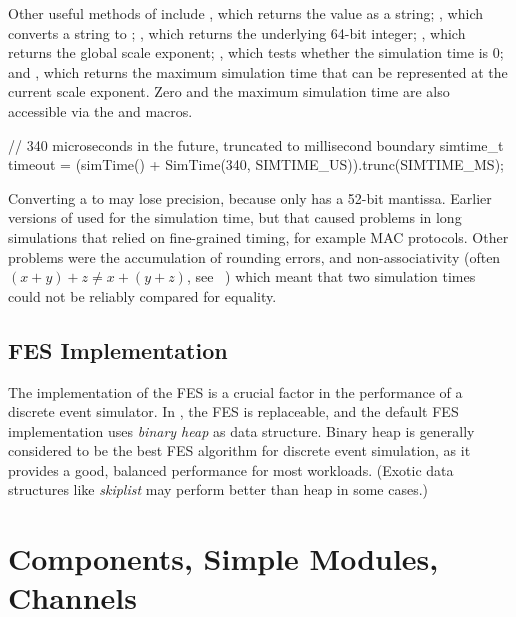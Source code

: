 Other useful methods of  include ,
which returns the value as a string; , which converts a
string to ; , which returns the
underlying 64-bit integer; , which returns the
global scale exponent; , which tests whether the
simulation time is 0; and , which returns the maximum
simulation time that can be represented at the current scale exponent.
Zero and the maximum simulation time are also accessible
via the  and  macros.

\begin{cpp}
// 340 microseconds in the future, truncated to millisecond boundary
simtime_t timeout = (simTime() + SimTime(340, SIMTIME_US)).trunc(SIMTIME_MS);
\end{cpp}

\begin{note}
   Converting a  to  may lose precision, because
    only has a 52-bit mantissa.
   Earlier versions of {\opp} used  for the simulation
   time, but that caused problems in long simulations that relied on fine-grained timing,
   for example MAC protocols. Other problems were the accumulation of
   rounding errors, and non-associativity (often $(x+y)+z \neq x+(y+z)$, see
   ~\cite{Goldberg91what}) which meant that two  simulation
   times could not be reliably compared for equality.
\end{note}


\subsection{FES Implementation}
\label{sec:simple-modules:fes-implementation}

The implementation of the FES is a crucial factor in the
performance of a discrete event simulator. In {\opp}, the FES is
replaceable, and the default FES implementation uses \textit{binary
heap} as data structure. Binary heap is generally
considered to be the best FES algorithm for discrete event simulation, as
it provides a good, balanced performance for most workloads. (Exotic data
structures like \textit{skiplist} may perform better than
heap in some cases.)


\section{Components, Simple Modules, Channels}
\label{sec:simple-modules:simple-modules-in-opp}

